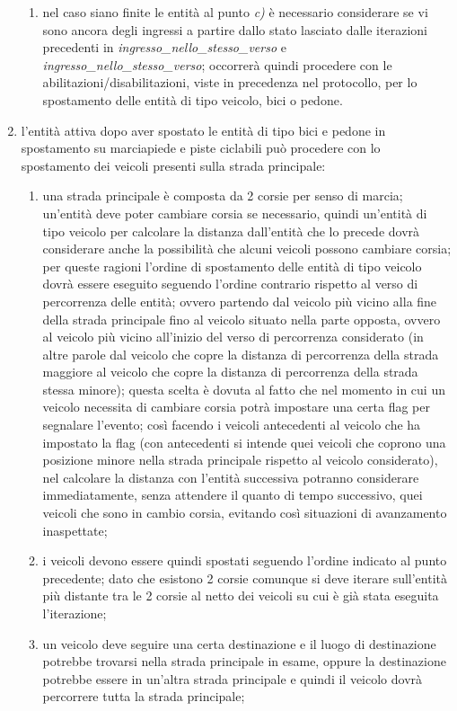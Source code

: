 \begin{enumerate}
\begin{enumerate}
\item nel caso siano finite le entità al punto \textit{c)} è necessario considerare se vi sono ancora degli ingressi a partire dallo stato lasciato dalle iterazioni precedenti in \textit{ingres\-so\_nel\-lo\_stes\-so\_ver\-so} e \textit{ingres\-so\_nel\-lo\_stes\-so\_ver\-so}; occorrerà quindi procedere con le abilitazioni/disabilitazioni, viste in precedenza nel protocollo, per lo spostamento delle entità di tipo veicolo, bici o pedone.
\end{enumerate}
\item l'entità attiva dopo aver spostato le entità di tipo bici e pedone in spostamento su marciapiede e piste ciclabili può procedere con lo spostamento dei veicoli presenti sulla strada principale:
\begin{enumerate}
\item una strada principale è composta da 2 corsie per senso di marcia; un'entità deve poter cambiare corsia se necessario, quindi un'entità di tipo veicolo per calcolare la distanza dall'entità che lo precede dovrà considerare anche la possibilità che alcuni veicoli possono cambiare corsia; per queste ragioni l'ordine di spostamento delle entità di tipo veicolo dovrà essere eseguito seguendo l'ordine contrario rispetto al verso di percorrenza delle entità; ovvero partendo dal veicolo più vicino alla fine della strada principale fino al veicolo situato nella parte opposta, ovvero al veicolo più vicino all'inizio del verso di percorrenza considerato (in altre parole dal veicolo che copre la distanza di percorrenza della strada maggiore al veicolo che copre la distanza di percorrenza della strada stessa minore); questa scelta è dovuta al fatto che nel momento in cui un veicolo necessita di cambiare corsia potrà impostare una certa flag per segnalare l'evento; così facendo i veicoli antecedenti al veicolo che ha impostato la flag (con antecedenti si intende quei veicoli che coprono una posizione minore nella strada principale rispetto al veicolo considerato), nel calcolare la distanza con l'entità successiva potranno considerare immediatamente, senza attendere il quanto di tempo successivo, quei veicoli che sono in cambio corsia, evitando così situazioni di avanzamento inaspettate;
\item i veicoli devono essere quindi spostati seguendo l'ordine indicato al punto precedente; dato che esistono 2 corsie comunque si deve iterare sull'entità più distante tra le 2 corsie al netto dei veicoli su cui è già stata eseguita l'iterazione;
\item un veicolo deve seguire una certa destinazione e il luogo di destinazione potrebbe trovarsi nella strada principale in esame, oppure la destinazione potrebbe essere in un'altra strada principale e quindi il veicolo dovrà percorrere tutta la strada principale;

\end{enumerate}
\end{enumerate}
